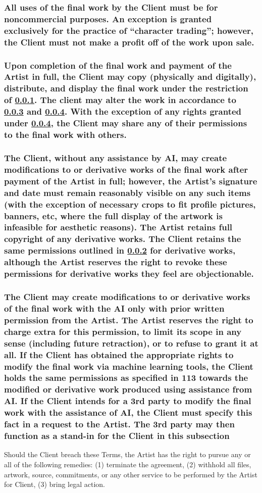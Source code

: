 \documentclass{article}
\newcommand{\hcm}[1][1]{\hspace{#1 cm}}
\newcommand{\subs}[2][]{\subsubsection[#1]{\normalfont #2}}
\begin{document}
\begin{flushleft}
		\subs[Commercial Use Restriction]{All uses of the final work by the Client must be for noncommercial purposes. An exception is granted exclusively for the practice of ``character trading''; however, the Client must not make a profit off of the work upon sale.}\label{clientnoncommercial}
		\hphantom{owo}

		\subs[Client Limited Copyright]{Upon completion of the final work and payment of the Artist in full, the Client may copy (physically and digitally), distribute, and display the final work under the restriction of \ref{clientnoncommercial}. The client may alter the work in accordance to \ref{clientderivative} and  \ref{clientai}. With the exception of any rights granted under \ref{clientai}, the Client may share any of their permissions to the final work with others.}\label{clientperms}

		\subs[Derivative Works]{The Client, without any assistance by AI, may create modifications to or derivative works of the final work after payment of the Artist in full; however, the Artist's signature and date must remain reasonably visible on any such items (with the exception of necessary crops to fit profile pictures, banners, etc, where the full display of the artwork is infeasible for aesthetic reasons). The Artist retains full copyright of any derivative works. The Client retains the same permissions outlined in \ref{clientperms} for derivative works, although the Artist reserves the right to revoke these permissions for derivative works they feel are objectionable.}\label{clientderivative}

		\subs[Client AI Policy]{The Client may create modifications to or derivative works of the final work with the AI only with prior written permission from the Artist. The Artist reserves the right to charge extra for this permission, to limit its scope in any sense (including future retraction), or to refuse to grant it at all. If the Client has obtained the appropriate rights to modify the final work via machine learning tools, the Client holds the same permissions as specified in 113 towards the modified or derivative work produced using assistance from AI. If the Client intends for a 3rd party to modify the final work with the assistance of AI, the Client must specify this fact in a request to the Artist. The 3rd party may then function as a stand-in for the Client in this subsection}\label{clientai}\hphantom{owo}

\begin{center}
Should the Client breach these Terms, the Artist has the right to pursue any or all of the following remedies: (1) terminate the agreement, (2) withhold all files, artwork, source, commitments, or any other service to be performed by the Artist for Client, (3) bring legal action.\\\hcm


\end{center}
\end{flushleft}
\end{document}
